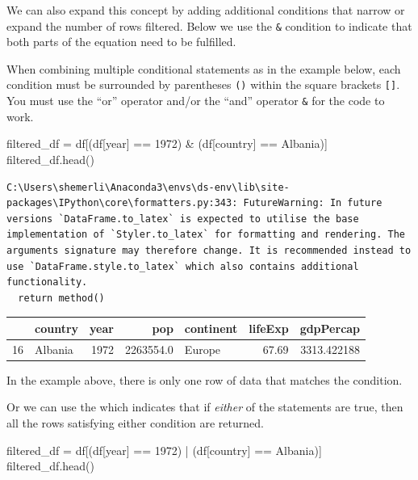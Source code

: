 \documentclass[
  letterpaper,
  DIV=11,
  numbers=noendperiod]{scrreprt}
\newenvironment{Shaded}{\begin{snugshade}}{\end{snugshade}}
\newcommand{\DecValTok}[1]{\textcolor[rgb]{0.68,0.00,0.00}{#1}}
\newcommand{\NormalTok}[1]{\textcolor[rgb]{0.00,0.23,0.31}{#1}}
\newcommand{\OperatorTok}[1]{\textcolor[rgb]{0.37,0.37,0.37}{#1}}
\newcommand{\StringTok}[1]{\textcolor[rgb]{0.13,0.47,0.30}{#1}}
\begin{document}
We can also expand this concept by adding additional conditions that
narrow or expand the number of rows filtered. Below we use the
\texttt{\&} condition to indicate that both parts of the equation need
to be fulfilled.

When combining multiple conditional statements as in the example below,
each condition must be surrounded by parentheses \texttt{()} within the
square brackets \texttt{{[}{]}}. You must use the ``or'' operator
\texttt{\textbar{}} and/or the ``and'' operator \texttt{\&} for the code
to work.

\begin{Shaded}
\begin{Highlighting}[]
\NormalTok{filtered\_df }\OperatorTok{=}\NormalTok{ df[(df[}\StringTok{\textquotesingle{}year\textquotesingle{}}\NormalTok{] }\OperatorTok{==} \DecValTok{1972}\NormalTok{) }\OperatorTok{\&}\NormalTok{ (df[}\StringTok{\textquotesingle{}country\textquotesingle{}}\NormalTok{] }\OperatorTok{==} \StringTok{\textquotesingle{}Albania\textquotesingle{}}\NormalTok{)]}
\NormalTok{filtered\_df.head()}
\end{Highlighting}
\end{Shaded}

\begin{verbatim}
C:\Users\shemerli\Anaconda3\envs\ds-env\lib\site-packages\IPython\core\formatters.py:343: FutureWarning: In future versions `DataFrame.to_latex` is expected to utilise the base implementation of `Styler.to_latex` for formatting and rendering. The arguments signature may therefore change. It is recommended instead to use `DataFrame.style.to_latex` which also contains additional functionality.
  return method()
\end{verbatim}

\begin{tabular}{llrrlrr}
\toprule
{} &  country &  year &        pop & continent &  lifeExp &    gdpPercap \\
\midrule
16 &  Albania &  1972 &  2263554.0 &    Europe &    67.69 &  3313.422188 \\
\bottomrule
\end{tabular}

In the example above, there is only one row of data that matches the
condition.

Or we can use the \texttt{\textbar{}} which indicates that if
\emph{either} of the statements are true, then all the rows satisfying
either condition are returned.

\begin{Shaded}
\begin{Highlighting}[]
\NormalTok{filtered\_df }\OperatorTok{=}\NormalTok{ df[(df[}\StringTok{\textquotesingle{}year\textquotesingle{}}\NormalTok{] }\OperatorTok{==} \DecValTok{1972}\NormalTok{) }\OperatorTok{|}\NormalTok{ (df[}\StringTok{\textquotesingle{}country\textquotesingle{}}\NormalTok{] }\OperatorTok{==} \StringTok{\textquotesingle{}Albania\textquotesingle{}}\NormalTok{)]}
\NormalTok{filtered\_df.head()}
\end{Highlighting}
\end{Shaded}
\end{document}
